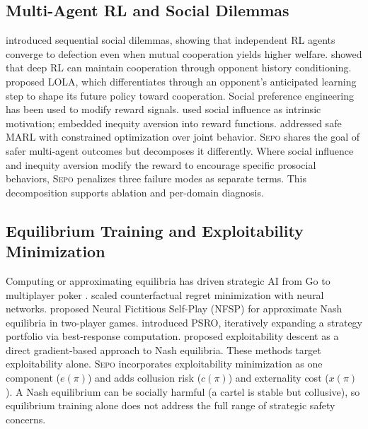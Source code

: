 \documentclass[letterpaper]{article} %
\newcommand{\sepo}{\textsc{Sepo}}
\begin{document}
\subsection{Multi-Agent RL and Social Dilemmas}
\citet{leibo2017multiagent} introduced sequential social dilemmas, showing that independent RL agents converge to defection even when mutual cooperation yields higher welfare. \citet{lerer2017maintaining} showed that deep RL can maintain cooperation through opponent history conditioning. \citet{foerster2018learning} proposed LOLA, which differentiates through an opponent's anticipated learning step to shape its future policy toward cooperation.
Social preference engineering has been used to modify reward signals. \citet{jaques2019social} used social influence as intrinsic motivation; \citet{hughes2018inequity} embedded inequity aversion into reward functions. \citet{zhang2024scalable} addressed safe MARL with constrained optimization over joint behavior.
\sepo{} shares the goal of safer multi-agent outcomes but decomposes it differently. Where social influence and inequity aversion modify the reward to encourage specific prosocial behaviors, \sepo{} penalizes three failure modes as separate terms. This decomposition supports ablation and per-domain diagnosis.
\subsection{Equilibrium Training and Exploitability Minimization}
Computing or approximating equilibria has driven strategic AI from Go \citep{silver2016mastering} to multiplayer poker \citep{brown2019superhuman}. \citet{brown2019deep} scaled counterfactual regret minimization with neural networks. \citet{heinrich2016deep} proposed Neural Fictitious Self-Play (NFSP) for approximate Nash equilibria in two-player games. \citet{lanctot2017unified} introduced PSRO, iteratively expanding a strategy portfolio via best-response computation. \citet{lockhart2019computing} proposed exploitability descent as a direct gradient-based approach to Nash equilibria. These methods target exploitability alone. \sepo{} incorporates exploitability minimization as one component ($e(\pi)$) and adds collusion risk ($c(\pi)$) and externality cost ($x(\pi)$). A Nash equilibrium can be socially harmful (a cartel is stable but collusive), so equilibrium training alone does not address the full range of strategic safety concerns.
\end{document}
